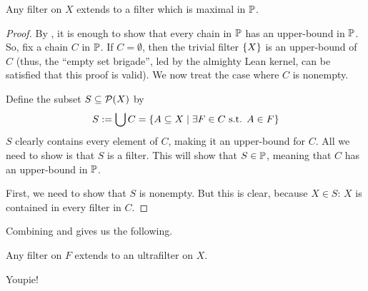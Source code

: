 \begin{boxproposition}\label{Ch2:Prop:Filter_extn_maxl}
    Any filter on $X$ extends to a filter which is maximal in $\P$.
\end{boxproposition}
\begin{proof}
    By , it is enough to show that every chain in $\P$ has an upper-bound in $\P$. So, fix a chain $C$ in $\P$. If $C = \emptyset$, then the trivial filter $\set{X}$ is an upper-bound of $C$ (thus, the ``empty set brigade'', led by the almighty Lean kernel, can be satisfied that this proof is valid). We now treat the case where $C$ is nonempty.

    Define the subset $S \ssq \Powset{X}$ by
    \begin{align*}
        S := \bigcup C = \setst{A \ssq X}{\exists F \in C \st A \in F}
    \end{align*}
    $S$ clearly contains every element of $C$, making it an upper-bound for $C$. All we need to show is that $S$ is a filter. This will show that $S \in \P$, meaning that $C$ has an upper-bound in $\P$.

    First, we need to show that $S$ is nonempty. But this is clear, because $X \in S$: $X$ is contained in every filter in $C$.

    \sorry %
\end{proof}

Combining  and  gives us the following.

\begin{boxcorollary}\label{Ch2:Cor:Filter_extn_ultrafilter}
    Any filter on $F$ extends to an ultrafilter on $X$.
\end{boxcorollary}

Youpie!